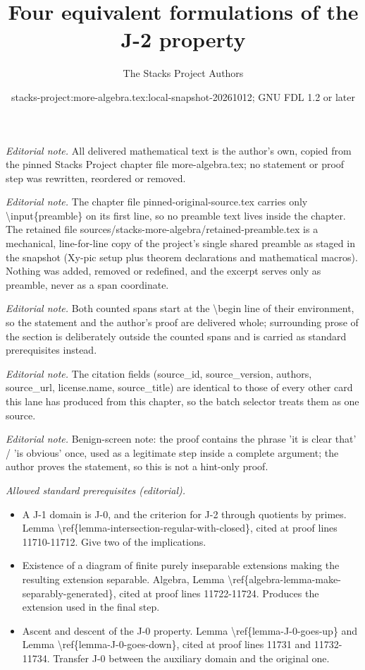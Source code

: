 \documentclass[10pt,a4paper]{amsart}
\title{Four equivalent formulations of the J-2 property}
\author{The Stacks Project Authors}
\date{stacks-project:more-algebra.tex:local-snapshot-20261012; GNU FDL 1.2 or later}
\theoremstyle{plain}
\theoremstyle{definition}
\theoremstyle{remark}
\numberwithin{equation}{subsection}
\begin{document}
\maketitle
\setcounter{subsection}{1}
\noindent\textit{Editorial note.} All delivered mathematical text is the author's own, copied from the pinned Stacks Project chapter file more-algebra.tex; no statement or proof step was rewritten, reordered or removed.\par\medskip
\noindent\textit{Editorial note.} The chapter file pinned-original-source.tex carries only \textbackslash{}input\{preamble\} on its first line, so no preamble text lives inside the chapter. The retained file sources/stacks-more-algebra/retained-preamble.tex is a mechanical, line-for-line copy of the project's single shared preamble as staged in the snapshot (Xy-pic setup plus theorem declarations and mathematical macros). Nothing was added, removed or redefined, and the excerpt serves only as preamble, never as a span coordinate.\par\medskip
\noindent\textit{Editorial note.} Both counted spans start at the \textbackslash{}begin line of their environment, so the statement and the author's proof are delivered whole; surrounding prose of the section is deliberately outside the counted spans and is carried as standard prerequisites instead.\par\medskip
\noindent\textit{Editorial note.} The citation fields (source\_id, source\_version, authors, source\_url, license.name, source\_title) are identical to those of every other card this lane has produced from this chapter, so the batch selector treats them as one source.\par\medskip
\noindent\textit{Editorial note.} Benign-screen note: the proof contains the phrase 'it is clear that' / 'is obvious' once, used as a legitimate step inside a complete argument; the author proves the statement, so this is not a hint-only proof.\par\medskip
\noindent\textit{Allowed standard prerequisites (editorial).}\begin{itemize}
\item A J-1 domain is J-0, and the criterion for J-2 through quotients by primes. Lemma \textbackslash{}ref\{lemma-intersection-regular-with-closed\}, cited at proof lines 11710-11712. Give two of the implications.
\item Existence of a diagram of finite purely inseparable extensions making the resulting extension separable. Algebra, Lemma \textbackslash{}ref\{algebra-lemma-make-separably-generated\}, cited at proof lines 11722-11724. Produces the extension used in the final step.
\item Ascent and descent of the J-0 property. Lemma \textbackslash{}ref\{lemma-J-0-goes-up\} and Lemma \textbackslash{}ref\{lemma-J-0-goes-down\}, cited at proof lines 11731 and 11732-11734. Transfer J-0 between the auxiliary domain and the original one.
\end{itemize}\medskip
\end{document}
